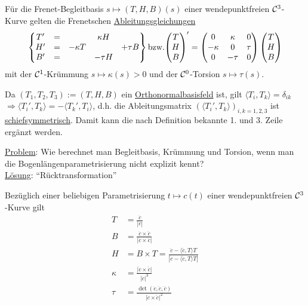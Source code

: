\begin{satz}\label{satz134}
 Für die Frenet-Begleitbasis \(s \mapsto (T,H,B)(s)\) einer wendepunktfreien \(\mathcal{C}^3\)-Kurve gelten die Frenetschen \uline{Ableitungsgleichungen}
 \[\begin{Bmatrix}
  T' &= &&\kappa H \\
  H' &= &-\kappa T &&+ \tau B \\
  B' &= &&-\tau H
 \end{Bmatrix} \text{bzw.}
 {\ensuremath{\begin{pmatrix} T \\ H \\ B \end{pmatrix} }}' = \begin{pmatrix}
                      0 & \kappa & 0 \\
                      -\kappa & 0 & \tau \\
                      0 & -\tau & 0
                     \end{pmatrix} \begin{pmatrix} T \\ H \\ B \end{pmatrix} 
 \]
mit der \(\mathcal{C}^1\)-Krümmung \(s \mapsto \kappa(s) > 0\) und der \(\mathcal{C}^0\)-Torsion \(s \mapsto \tau(s) \).
\end{satz}

\begin{beweis} 
Da \((T_1, T_2, T_3) := (T,H,B)\) ein \uline{Orthonormalbasisfeld} ist, gilt \(\langle T_i, T_k \rangle = \delta_{ik}\) \\
 \(\Rightarrow \langle T_i', T_k \rangle = -\langle T_k', T_i \rangle\), d.h. die Ableitungsmatrix \((\langle T_i', T_k \rangle)_{i,k=1,2,3}\) ist \uline{schiefsymmetrisch}. Damit kann die nach Definition bekannte 1. und 3. Zeile ergänzt werden.
\end{beweis}

\uline{Problem}: Wie berechnet man Begleitbasis, Krümmung und Torsion, wenn man die Bogenlängen\-parametrisierung nicht explizit kennt? \\
\uline{Lösung}: "`Rücktransformation"'

\begin{folgerung}
 Bezüglich einer beliebigen Parametrisierung \(t \mapsto c(t)\) einer wendepunktfreien \(\mathcal{C}^3\)-Kurve gilt
 \begin{align*}
  T &= \frac{\dot c}{|\dot c|} \\
  B &= \frac{\dot c \times \ddot c}{|\dot c \times \ddot c|} \\
  H &= B \times T = \frac{\ddot c - \langle \ddot c, T \rangle T}{|\ddot c - \langle \ddot c, T \rangle T|} \\
  \kappa &= \frac{|\dot c \times \ddot c|}{|\dot c|^3} \\
  \tau &= \frac{\det (\dot c, \ddot c, \dddot c)}{|\dot c \times \ddot c|^2}
 \end{align*}

\end{folgerung}

